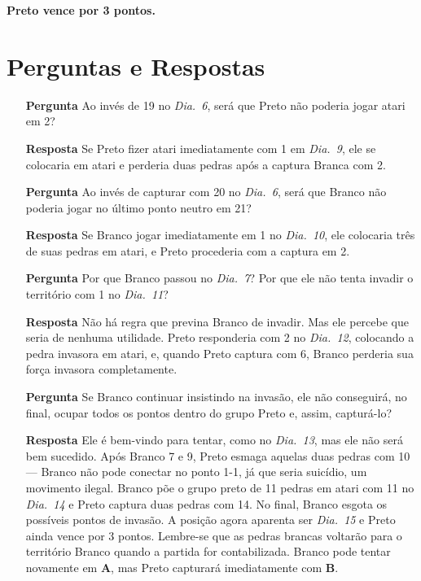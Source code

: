 \textbf{Preto vence por 3 pontos.}

\section{Perguntas e Respostas}

\begin{itemize}
    \item[\textbf{Pergunta}]
      Ao invés de 19 no \emph{Dia.\@~6}, será que Preto não poderia jogar atari em 2?
    \item[\textbf{Resposta}] 
      Se Preto fizer atari imediatamente com 1 em \emph{Dia.\@~9}, ele se colocaria em atari e perderia  duas pedras após a captura Branca com 2.
    \item[\textbf{Pergunta}]
      Ao invés de capturar com 20 no \emph{Dia.\@~6}, será que Branco não poderia jogar no último ponto neutro em 21?
    \item[\textbf{Resposta}] 
      Se Branco jogar imediatamente em 1 no \emph{Dia.\@~10}, ele colocaria três de suas pedras em atari, e Preto procederia com a captura em 2.
    \item[\textbf{Pergunta}]
      Por que Branco passou no \emph{Dia.\@~7}? Por que ele não tenta invadir o território com 1 no \emph{Dia.\@~11}?
    \item[\textbf{Resposta}] 
      Não há regra que previna Branco de invadir. Mas ele percebe que seria de nenhuma utilidade. Preto responderia com 2 no \emph{Dia.\@~12}, colocando a pedra invasora em atari, e, quando Preto captura com 6, Branco perderia sua força invasora completamente.
    \item[\textbf{Pergunta}]
      Se Branco continuar insistindo na invasão, ele não conseguirá, no final, ocupar todos os pontos dentro do grupo Preto e, assim, capturá-lo?
    \item[\textbf{Resposta}] 
      Ele é bem-vindo para tentar, como no \emph{Dia.\@~13}, mas ele não será bem sucedido. Após Branco 7 e 9, Preto esmaga aquelas duas pedras com 10 --- Branco não pode conectar no ponto 1-1, já que seria suicídio, um movimento ilegal. Branco põe o grupo preto de 11 pedras em atari com 11 no \emph{Dia.\@~14} e Preto captura duas pedras com 14. No final, Branco esgota os possíveis pontos de invasão. A posição agora aparenta ser \emph{Dia.\@~15} e Preto ainda vence por 3 pontos. Lembre-se que as pedras brancas voltarão para o território Branco quando a partida for contabilizada. Branco pode tentar novamente em \textbf{A}, mas Preto capturará imediatamente com \textbf{B}.
      

\end{itemize}
